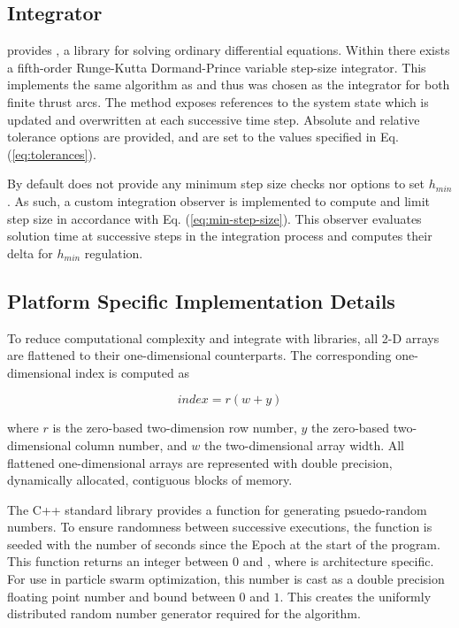 \subsection{Integrator}

\noindent {} provides , a library for solving ordinary differential equations. Within 
there exists a fifth-order Runge-Kutta Dormand-Prince variable
step-size integrator. This implements the same algorithm as  and thus was chosen as the integrator for both finite
thrust arcs. The method exposes references to the system state which is updated and overwritten at each successive time step. Absolute
and relative tolerance options are provided, and are set to the values specified in Eq. (\ref{eq:tolerances}). \newline

\noindent By default  does not provide any minimum step size checks nor options to set $h_{min}$.
As such, a custom integration observer is implemented to compute and limit step size in accordance with Eq. (\ref{eq:min-step-size}). 
This observer evaluates solution time at successive steps in the integration process and computes their delta for 
$h_{min}$ regulation.

\subsection{Platform Specific Implementation Details}

\noindent To reduce computational complexity and integrate with  libraries, all 2-D arrays
are flattened to their one-dimensional counterparts. The corresponding one-dimensional index is computed as

\begin{equation}
    index = r(w+y)
    \label{eq:index-conversion}
\end{equation}

\noindent where $r$ is the zero-based two-dimension row number, $y$ the zero-based two-dimensional column number, and $w$ the two-dimensional array width. All flattened one-dimensional arrays are represented with double precision, dynamically allocated, contiguous blocks
of memory. \newline

\noindent
The C++ standard library provides a  function for generating psuedo-random numbers.
To ensure randomness between successive executions, the  function is seeded with the number
of seconds since the Epoch at the start of the program. This function returns an integer 
between $0$ and , where  is architecture specific. 
For use in particle swarm optimization, this number is cast as a double
precision floating point number and bound between $0$ and $1$. This creates the uniformly distributed
random number generator required for the algorithm. \newline

